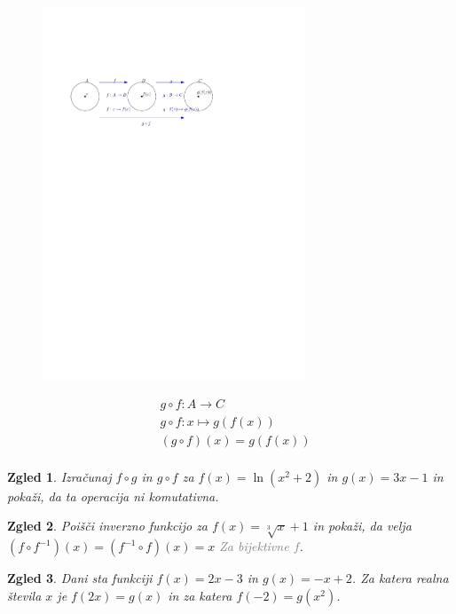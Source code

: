 \documentclass{article}
\newtheorem*{zgled}{Zgled}
\begin{document}
\begin{figure}[H]
    \includegraphics[width=0.7\textwidth]{kompozitum.pdf}
    \centering
\end{figure}

\begin{align*}
    & g\circ f: A\rightarrow C\\
    & g\circ f: x\mapsto g(f(x))\\
    & (g\circ f)(x)=g(f(x))\\
\end{align*}

\begin{zgled}
    Izračunaj $f\circ g$ in $g\circ f$ za $f(x)=\ln (x^2+2)$ in $g(x)=3x-1$ in pokaži, da ta operacija ni komutativna.
\end{zgled}

\begin{zgled}
    Poišči inverzno funkcijo za $f(x)=\sqrt[3]{x}+1$ in pokaži, da velja $(f\circ f^{-1})(x)=(f^{-1}\circ f)(x)=x$ \textcolor{gray}{Za bijektivne $f$}.
\end{zgled}
   
\begin{zgled}
    Dani sta funkciji $f(x)=2x-3$ in $g(x)=-x+2$. Za katera realna števila $x$ je $f(2x)=g(x)$ in za katera $f(-2)=g(x^2)$.
\end{zgled}
\end{document}
